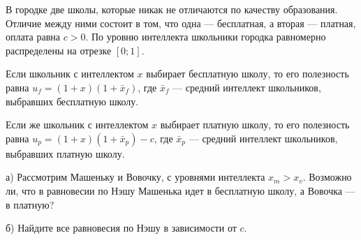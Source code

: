 \begin{problem}
\begin{sol}

\end{sol}
\end{problem}




\begin{problem}
В городке две школы, которые никак не отличаются по качеству образования. Отличие между ними состоит в том, что одна — бесплатная, а вторая — платная, оплата равна $c>0$. По уровню интеллекта школьники городка равномерно распределены на отрезке $[0;1]$. \par
Если школьник с интеллектом $x$ выбирает бесплатную школу, то его полезность равна $u_{f}=(1+x)(1+\bar{x}_{f})$, где $\bar{x}_{f}$ — средний интеллект школьников, выбравших бесплатную школу. \par
Если же школьник с интеллектом $x$ выбирает платную школу, то его полезность равна $u_{p}=(1+x)(1+\bar{x}_{p})-c$, где $\bar{x}_{p}$ — средний интеллект школьников, выбравших платную школу. \par
а) Рассмотрим Машеньку и Вовочку, с уровнями интеллекта $x_{m}>x_{v}$. Возможно ли, что в равновесии по Нэшу Машенька идет в бесплатную школу, а Вовочка — в платную? \par
б) Найдите все равновесия по Нэшу в зависимости от $c$.



\begin{sol}


\end{sol}
\end{problem}
